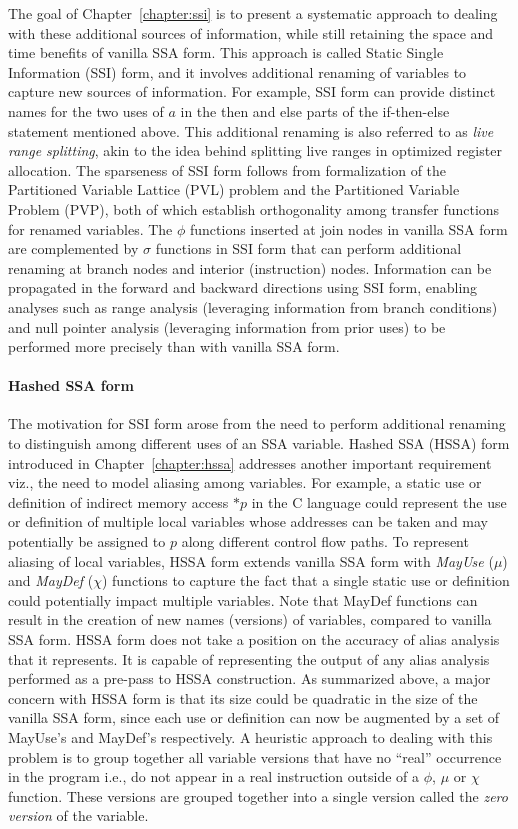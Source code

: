 The goal of Chapter~\ref{chapter:ssi} is to present a systematic approach to dealing with these additional sources of information, while still retaining the space and time benefits of vanilla SSA form.  This approach is called Static Single Information (SSI) form, and it involves additional renaming of variables to capture new sources of information.  For example, SSI form can provide distinct names for the two uses of $a$ in the then and else parts of the if-then-else statement mentioned above.  This additional renaming is also referred to as {\em live range splitting}, akin to the idea behind splitting live ranges in optimized register allocation.  The sparseness of SSI form follows from formalization of the Partitioned Variable Lattice (PVL)  problem and the Partitioned Variable Problem (PVP), both of which establish orthogonality among transfer functions for renamed variables.  The $\phi$ functions inserted at join nodes in vanilla SSA form are complemented by $\sigma$ functions in SSI form that can perform additional renaming at branch nodes and interior (instruction) nodes.  Information can be propagated in the forward and backward directions using SSI form, enabling analyses such as range analysis (leveraging information from branch conditions) and null pointer analysis (leveraging information from prior uses) to be performed more precisely than with vanilla SSA form.

\paragraph{Hashed SSA form}

The motivation for SSI form arose from the need to perform additional renaming to distinguish among different uses of an SSA variable.  Hashed SSA (HSSA) form introduced in Chapter~\ref{chapter:hssa} addresses another important requirement viz., the need to model aliasing among variables.  For example, a static use or definition of indirect memory access $*p$ in the C language could represent the use or definition of multiple local variables whose addresses can be taken and may potentially be assigned to $p$ along different control flow paths.  To represent aliasing of local variables, HSSA form extends vanilla SSA form with  {\em MayUse} ($\mu$) and {\em MayDef} ($\chi$) functions to capture the fact that a single static use or definition could potentially impact multiple variables.  Note that MayDef functions can result in the creation of new names (versions) of variables, compared to vanilla SSA form.  HSSA form does not take a position on the accuracy of alias analysis that it represents.  It is capable of representing the output of any alias analysis performed as a pre-pass to HSSA construction.
As summarized above, a major concern with HSSA form is that its size could be quadratic in the size of the vanilla SSA form, since each use or definition can now be augmented by a set of MayUse's and MayDef's respectively.  A heuristic approach to dealing with this problem is to group together all variable versions that have no ``real'' occurrence in the program i.e., do not appear in a real instruction outside of a $\phi$, $\mu$ or $\chi$ function.  These versions are grouped together into a single version called the {\em zero version} of the variable.

